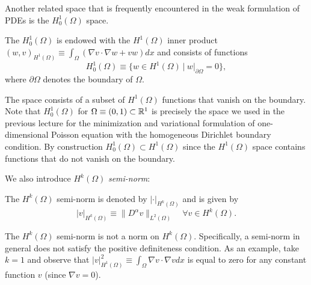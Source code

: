 Another related space that is frequently encountered in the weak formulation of PDEs is the $H^1_0(\Omega)$ space.
\begin{definition} The $H^1_0(\Omega)$ is endowed with the $H^1(\Omega)$ inner product $(w,v)_{H^1(\Omega)} \equiv \int_\Omega (\nabla v \cdot \nabla w + v w) dx$ and consists of functions
\begin{equation*}
  H^1_0(\Omega) \equiv \{ w \in H^1(\Omega) \ | \ w|_{\partial \Omega} = 0 \},
\end{equation*}
where $\partial \Omega$ denotes the boundary of $\Omega$.
\end{definition}
The space consists of a subset of $H^1(\Omega)$ functions that vanish on the boundary.  Note that $H^1_0(\Omega)$ for $\Omega \equiv (0,1) \subset \mathbb{R}^1$ is precisely the space we used in the previous lecture for the minimization and variational formulation of one-dimensional Poisson equation with the homogeneous Dirichlet boundary condition.  By construction $H^1_0(\Omega) \subset H^1(\Omega)$ since the $H^1(\Omega)$ space contains functions that do not vanish on the boundary.

We also introduce $H^k(\Omega)$ \emph{semi-norm}:
\begin{definition}
  The $H^k(\Omega)$ semi-norm is denoted by $| \cdot |_{H^k(\Omega)}$ and is given by
  \begin{equation*}
    | v |_{H^k(\Omega)} \equiv \| D^\alpha v \|_{L^2(\Omega)} \quad \forall v \in H^k(\Omega).
  \end{equation*}  
\end{definition}
\begin{remark}
  The $H^k(\Omega)$ semi-norm is not a norm on $H^k(\Omega)$.  Specifically, a semi-norm in general does not satisfy the positive definiteness condition.  As an example, take $k = 1$ and observe that $| v |^2_{H^1(\Omega)} \equiv \int_{\Omega} \nabla v \cdot \nabla v dx$ is equal to zero for any constant function $v$ (since $\nabla v = 0$).
\end{remark}

